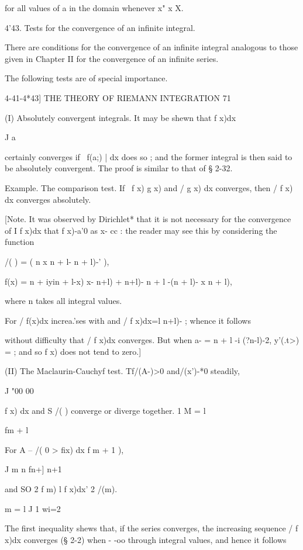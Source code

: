 for all values of a in the domain whenever x" x X.

4'43. Tests for the convergence of an infinite integral.

There are conditions for the convergence of an infinite integral
analogous to those given in Chapter II for the convergence of an
infinite series.

The following tests are of special importance.






4-41-4*43] THE THEORY OF RIEMANN INTEGRATION 71



(I) Absolutely convergent integrals. It may be shewn that f x)dx

J a

certainly converges if \ f(a;) | dx does so ; and the former integral
is then said to be absolutely convergent. The proof is similar to that
of § 2-32.

Example. The comparison test. If \ f x) g x) and / g x) dx converges,
then / f x) dx converges absolutely.

[Note. It was observed by Dirichlet* that it is not necessary for the
convergence of I f x)dx that f x)-a'0 as x- cc : the reader may see
this by considering the function

/( ) = ( n x n + l- n + l)-' ),

f(x) = n + iyin + l-x) x- n+l) + n+l)- n + l -(n + l)- x n + l),

where n takes all integral values.

For / f(x)dx increa.'ses with and / f x)dx=l n+l)- ; whence it follows

without difficulty that / f x)dx converges. But when a- = n + l -i
(?n-l)-2, y'(.t>) = ; and so f x) does not tend to zero.]

(II) The Maclaurin-Cauchyf test. Tf/(A-)>0 and/(x')-*0 steadily,

J "00 00

f x) dx and S /( ) converge or diverge together. 1 M = l

fm + l

For A -- /( 0 > fix) dx f m + 1 ),

J m n fn+] n+1

and SO 2 f m) l f x)dx' 2 /(m).

  m = l J 1 wi=2

The first inequality shews that, if the series converges, the
increasing sequence / f x)dx converges (§ 2-2) when - -oo through
integral values, and hence it follows

